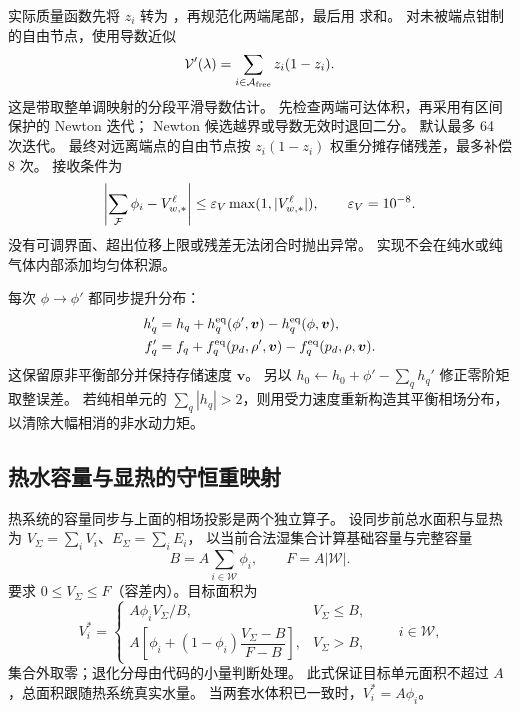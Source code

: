 实际质量函数先将 $z_i$ 转为 ，再规范化两端尾部，最后用  求和。
对未被端点钳制的自由节点，使用导数近似
\begin{equation}
 \mathcal V'(\lambda)=\sum_{i\in\mathcal A_{\rm free}}z_i(1-z_i).
\end{equation}
这是带取整单调映射的分段平滑导数估计。
先检查两端可达体积，再采用有区间保护的 Newton 迭代；
Newton 候选越界或导数无效时退回二分。
默认最多 64 次迭代。
最终对远离端点的自由节点按 $z_i(1-z_i)$ 权重分摊存储残差，最多补偿 8 次。
接收条件为
\begin{equation}
 \left|\sum_{\mathcal F}\phi_i-V_{w,*}^{\ell}\right|
 \leq\varepsilon_V\max(1,|V_{w,*}^{\ell}|),\qquad \varepsilon_V=10^{-8}.
\end{equation}
没有可调界面、超出位移上限或残差无法闭合时抛出异常。
实现不会在纯水或纯气体内部添加均匀体积源。

每次 $\phi\to\phi'$ 都同步提升分布：
\begin{align}
 h_q'&=h_q+h_q^{\rm eq}(\phi',\bm v)-h_q^{\rm eq}(\phi,\bm v),\\
 f_q'&=f_q+f_q^{\rm eq}(p_d,\rho',\bm v)-f_q^{\rm eq}(p_d,\rho,\bm v).
 \label{eq:population-lift}
\end{align}
这保留原非平衡部分并保持存储速度 $\bm v$。
另以 $h_0\leftarrow h_0+\phi'-\sum_qh_q'$ 修正零阶矩取整误差。
若纯相单元的 $\sum_q|h_q|>2$，则用受力速度重新构造其平衡相场分布，
以清除大幅相消的非水动力矩。


\subsection{热水容量与显热的守恒重映射}
\label{sec:remap}
热系统的容量同步与上面的相场投影是两个独立算子。
设同步前总水面积与显热为 $V_\Sigma=\sum_iV_i$、$E_\Sigma=\sum_iE_i$，
以当前合法湿集合计算基础容量与完整容量
\begin{equation}
 B=A\sum_{i\in\mathcal W}\phi_i,\qquad F=A|\mathcal W|.
\end{equation}
要求 $0\leq V_\Sigma\leq F$（容差内）。目标面积为
\begin{equation}
 V_i^*=\begin{cases}
 A\phi_i V_\Sigma/B,&V_\Sigma\leq B,\\
 A\left[\phi_i+(1-\phi_i)\dfrac{V_\Sigma-B}{F-B}\right],&V_\Sigma>B,
 \end{cases}\qquad i\in\mathcal W,
 \label{eq:aperture}
\end{equation}
集合外取零；退化分母由代码的小量判断处理。
此式保证目标单元面积不超过 $A$，总面积跟随热系统真实水量。
当两套水体积已一致时，$V_i^*=A\phi_i$。

